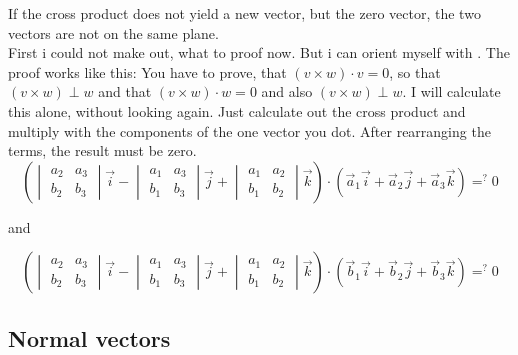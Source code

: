 \documentclass[a4paper]{article}
\begin{document}
If the cross product does not yield a new vector, but the  zero vector, the two vectors are not on the same plane.\\

First i could not make out, what to proof now. But i can orient myself with \cite{Corral1}. The proof works like this: You have to prove, that $(v \times w) \cdot v = 0$, so that $(v \times w) \perp w$ and that $(v \times w) \cdot w = 0$ and also $(v \times w) \perp w$. I will calculate this alone, without looking again. Just calculate out the cross product and multiply with the components of the one vector you dot. After rearranging the terms, the result must be zero.\\

\begin{displaymath}
\left(\begin{vmatrix}
a_2 & a_3 \\
b_2 & b_3 
\end{vmatrix} \vec{i} - \begin{vmatrix}a_1 & a_3\\ b_1 & b_3\end{vmatrix} \vec{j} + \begin{vmatrix}a_1 & a_2\\b_1 & b_2\end{vmatrix} \vec{k}\right) \cdot \left(\vec{a}_{1}\vec{i} + \vec{a}_{2}\vec{j} + \vec{a}_{3}\vec{k}\right) =\nolimits^{?} 0
\end{displaymath}

and

\begin{displaymath}
\left(\begin{vmatrix}
a_2 & a_3 \\
b_2 & b_3 
\end{vmatrix} \vec{i} - \begin{vmatrix}a_1 & a_3\\ b_1 & b_3\end{vmatrix} \vec{j} + \begin{vmatrix}a_1 & a_2\\b_1 & b_2\end{vmatrix} \vec{k}\right) \cdot \left(\vec{b}_{1}\vec{i} + \vec{b}_{2}\vec{j} + \vec{b}_{3}\vec{k}\right) =\nolimits^{?} 0
\end{displaymath}



\subsection{Normal vectors}
\end{document}
